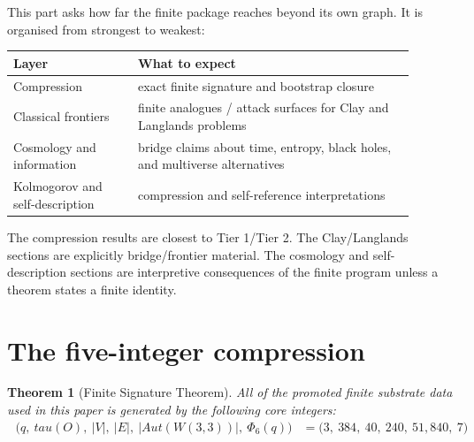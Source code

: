 \documentclass[11pt]{article}
\def\mathrm#1{#1}%
\def\Phi#1{Phi#1}%
\def\tau{tau}%
\newtheorem*{theorem}{Theorem}
\begin{document}
This part asks how far the finite package reaches beyond its own graph. It is organised from strongest to weakest:

\begin{center}
\renewcommand{\arraystretch}{1.2}
\begin{tabular}{>{\raggedright\arraybackslash}p{0.28\linewidth} >{\raggedright\arraybackslash}p{0.62\linewidth}}
\toprule
Layer & What to expect \\
\midrule
Compression & exact finite signature and bootstrap closure \\
Classical frontiers & finite analogues / attack surfaces for Clay and Langlands problems \\
Cosmology and information & bridge claims about time, entropy, black holes, and multiverse alternatives \\
Kolmogorov and self-description & compression and self-reference interpretations \\
\bottomrule
\end{tabular}
\end{center}

\begin{statusbox}[title=How to read this part]
The compression results are closest to Tier 1/Tier 2. The Clay/Langlands sections are explicitly bridge/frontier material. The cosmology and self-description sections are interpretive consequences of the finite program unless a theorem states a finite identity.
\end{statusbox}

\section{The five-integer compression}

\begin{theorem}[Finite Signature Theorem]
All of the promoted finite substrate data used in this paper is generated by the following core integers:
\[
\boxed{\;
\begin{aligned}
\bigl(q,\ \tau(O),\ |V|,\ |E|,\ |\mathrm{Aut}(W(3,3))|,\ \Phi_6(q)\bigr)
&=\bigl(3,\ 384,\ 40,\ 240,\ 51{,}840,\ 7\bigr)
\end{aligned}
\;}
\]
\end{theorem}
\end{document}
